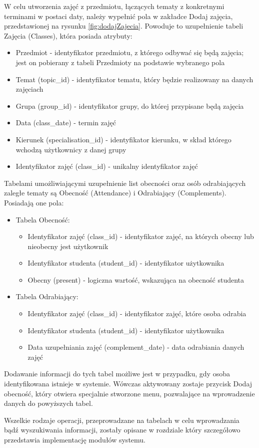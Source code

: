 W celu utworzenia zajęć z przedmiotu, łączących tematy z konkretnymi terminami w postaci daty, należy wypełnić pola w zakładce Dodaj zajęcia, przedstawionej na rysunku \ref{fig:dodajZajecia}. Powoduje to uzupełnienie tabeli Zajęcia (Classes), która posiada atrybuty:
\begin{itemize}
\item Przedmiot - identyfikator przedmiotu, z którego odbywać się będą zajęcia; jest on pobierany z tabeli Przedmioty na podstawie wybranego pola
\item Temat (topic\_id) - identyfikator tematu, który będzie realizowany na danych zajęciach
\item Grupa (group\_id) - identyfikator grupy, do której przypisane będą zajęcia
\item Data (class\_date) - termin zajęć
\item Kierunek (specialisation\_id) - identyfikator kierunku, w skład którego wchodzą użytkownicy z danej grupy
\item Identyfikator zajęć (class\_id) - unikalny identyfikator zajęć
\end{itemize}
Tabelami umożliwiającymi uzupełnienie list obecności oraz osób odrabiających zaległe tematy są Obecność (Attendance) i Odrabiający (Complements). Posiadają one pola:
\begin{itemize}
\item Tabela Obecność:
\begin{itemize}
\item Identyfikator zajęć (class\_id) - identyfikator zajęć, na których obecny lub nieobecny jest użytkownik
\item Identyfikator studenta (student\_id) - identyfikator użytkownika
\item Obecny (present) - logiczna wartość, wskazująca na obecność studenta
\end{itemize}
\item Tabela Odrabiający:
\begin{itemize}
\item Identyfikator zajęć (class\_id) - identyfikator zajęć, które osoba odrabia
\item Identyfikator studenta (student\_id) - identyfikator użytkownika
\item Data uzupełniania zajęć (complement\_date) - data odrabiania danych zajęć
\end{itemize}
\end{itemize}

Dodawanie informacji do tych tabel możliwe jest w przypadku, gdy osoba identyfikowana istnieje w systemie. Wówczas aktywowany zostaje przycisk Dodaj obecność, który otwiera specjalnie stworzone menu, pozwalające na wprowadzenie danych do powyższych tabel.

Wszelkie rodzaje operacji, przeprowadzane na tabelach w celu wprowadzania bądź wyszukiwania informacji, zostały opisane w rozdziale który szczegółowo przedstawia implementację modułów systemu.
